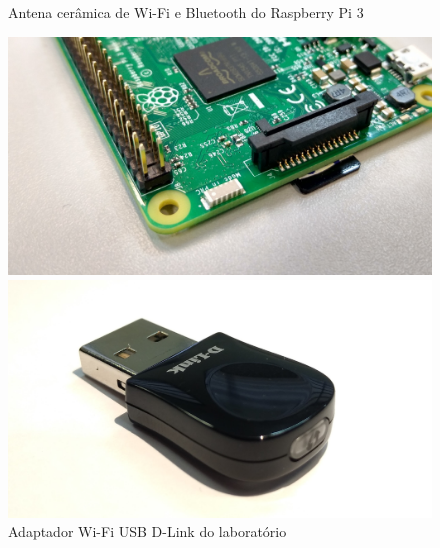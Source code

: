 \begin{figure}[htb]
 \label{adaptadores-usb}
 \centering
  \begin{minipage}{0.49\textwidth}
    \centering
    \caption{Antena cerâmica de Wi-Fi e Bluetooth do Raspberry Pi 3 \label{fig-rpi-onboard}}
    \includegraphics[width=1\textwidth]{040-plataformas/RPi-WiFi-dongles/cut_rpi-onboard.jpg}
  \end{minipage}
  \hfill
  \begin{minipage}{0.49\textwidth}
	\centering
  	\caption{Adaptador Wi-Fi USB D-Link do laboratório \label{fig-dlink}}
  	\includegraphics[width=1\textwidth]{040-plataformas/RPi-WiFi-dongles/cut_dlink.jpg}
  \end{minipage}
\end{figure}

